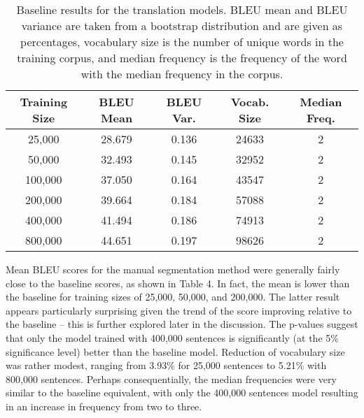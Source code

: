 \documentclass[11pt]{article}
\begin{document}
\begin{table}[h]
\centering
\begin{tabular}{|c|c|c|c|c|}
\hline
Training Size & BLEU Mean & BLEU Var. & Vocab. Size & Median Freq. \\ \hline
25,000             & 28.679    & 0.136         & 24633           & 2                     \\
50,000             & 32.493    & 0.145         & 32952           & 2                     \\
100,000            & 37.050    & 0.164         & 43547           & 2                     \\
200,000            & 39.664    & 0.184         & 57088           & 2                     \\
400,000            & 41.494    & 0.186         & 74913           & 2                     \\
800,000            & 44.651    & 0.197         & 98626           & 2                     \\ \hline
\end{tabular}
\caption{Baseline results for the translation models. BLEU mean and BLEU variance are taken from a bootstrap distribution and are given as percentages, vocabulary size is the number of unique words in the training corpus, and median frequency is the frequency of the word with the median frequency in the corpus.}
\label{table:baseline}
\end{table}

\bigskip

Mean BLEU scores for the manual segmentation method were generally fairly close to the baseline scores, as shown in Table 4. In fact, the mean is lower than the baseline for training sizes of 25,000, 50,000, and 200,000. The latter result appears particularly surprising given the trend of the score improving relative to the baseline -- this is further explored later in the discussion. The p-values suggest that only the model trained with 400,000 sentences is significantly (at the 5\% significance level) better than the baseline model. Reduction of vocabulary size was rather modest, ranging from 3.93\% for 25,000 sentences to 5.21\% with 800,000 sentences. Perhaps consequentially, the median frequencies were very similar to the baseline equivalent, with only the 400,000 sentences model resulting in an increase in frequency from two to three.

\bigskip
\end{document}
